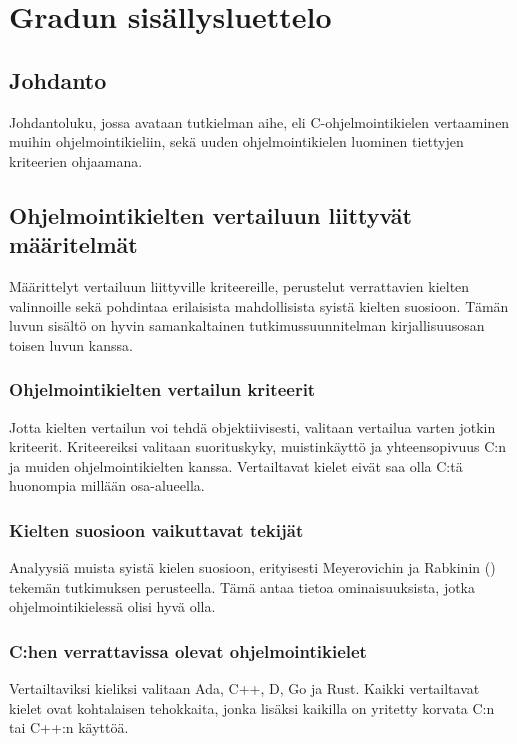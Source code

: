 \section{Gradun sisällysluettelo}

\subsection{Johdanto}

Johdantoluku, jossa avataan tutkielman aihe, eli C-ohjelmointikielen
vertaaminen muihin ohjelmointikieliin, sekä uuden ohjelmointikielen luominen
tiettyjen kriteerien ohjaamana.

\subsection{Ohjelmointikielten vertailuun liittyvät määritelmät}

Määrittelyt vertailuun liittyville kriteereille, perustelut verrattavien
kielten valinnoille sekä pohdintaa erilaisista mahdollisista syistä kielten
suosioon. Tämän luvun sisältö on hyvin samankaltainen tutkimussuunnitelman
kirjallisuusosan toisen luvun kanssa.

\subsubsection{Ohjelmointikielten vertailun kriteerit}

Jotta kielten vertailun voi tehdä objektiivisesti, valitaan vertailua varten
jotkin kriteerit. Kriteereiksi valitaan suorituskyky, muistinkäyttö ja
yhteensopivuus C:n ja muiden ohjelmointikielten kanssa. Vertailtavat kielet
eivät saa olla C:tä huonompia millään osa-alueella.

\subsubsection{Kielten suosioon vaikuttavat tekijät}

Analyysiä muista syistä kielen suosioon, erityisesti Meyerovichin ja Rabkinin
(\citeyear{empiricalpopularity}) tekemän tutkimuksen perusteella. Tämä antaa
tietoa ominaisuuksista, jotka ohjelmointikielessä olisi hyvä olla.

\subsubsection{C:hen verrattavissa olevat ohjelmointikielet}

Vertailtaviksi kieliksi valitaan Ada, C++, D, Go ja Rust. Kaikki vertailtavat
kielet ovat kohtalaisen tehokkaita, jonka lisäksi kaikilla on yritetty korvata
C:n tai C++:n käyttöä.

